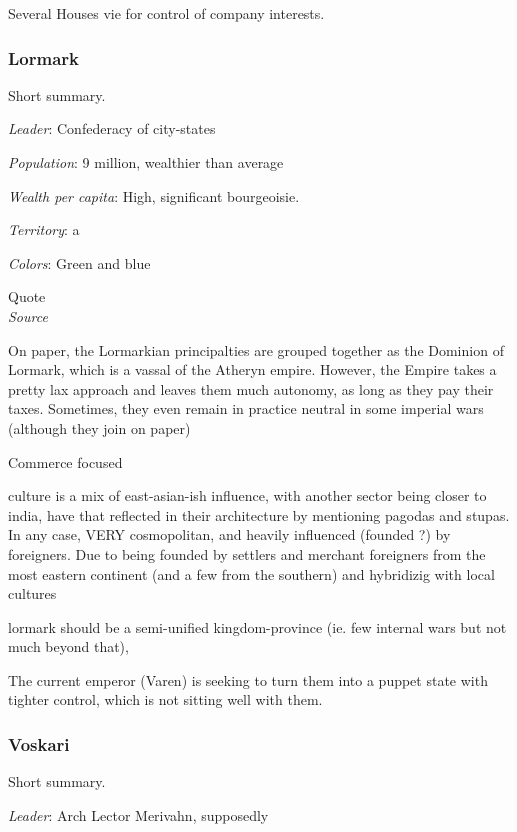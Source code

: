 Several Houses vie for control of company interests.



\subsubsection{Lormark}

Short summary.

\textit{Leader}: Confederacy of city-states

\textit{Population}: 9 million, wealthier than average

\textit{Wealth per capita}: High, significant bourgeoisie.

\textit{Territory}: a
    
\textit{Colors}: Green and blue


\begin{rpg-quotebox}
Quote \\ \textendash \textit{Source}
\end{rpg-quotebox}

On paper, the Lormarkian principalties are grouped together as the Dominion of Lormark, which is a vassal of the Atheryn empire. However, the Empire takes a pretty lax approach and leaves them much autonomy, as long as they pay their taxes. Sometimes, they even remain in practice neutral in some imperial wars (although they join on paper)

Commerce focused

culture is a mix of east-asian-ish influence, with another sector being closer to india, have that reflected in their architecture by mentioning pagodas and stupas. In any case, VERY cosmopolitan, and heavily influenced (founded ?) by foreigners. Due to being founded by settlers and merchant foreigners from the most eastern continent (and a few from the southern) and hybridizig with local cultures

lormark should be a semi-unified kingdom-province (ie. few internal wars but not much beyond that), 

The current emperor (Varen) is seeking to turn them into a puppet state with tighter control, which is not sitting well with them.

	

\subsubsection{Voskari}

Short summary.


\textit{Leader}: Arch Lector Merivahn, supposedly

